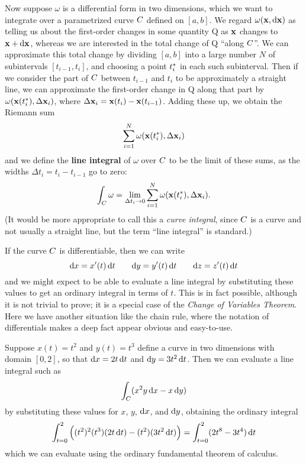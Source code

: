 \documentclass[12pt]{amsart}
\begin{document}
Now suppose $\omega$ is a differential form in two dimensions, which we want to integrate over a parametrized curve $C$ defined on $[a,b]$.
We regard $\omega(\mathbf{x},{\mathrm{d} \mathbf{x}})$ as telling us about the first-order changes in some quantity Q as $\mathbf{x}$ changes to $\mathbf{x}+{\mathrm{d} \mathbf{x}}$, whereas we are interested in the total change of Q ``along $C$''.
We can approximate this total change by dividing $[a,b]$ into a large number $N$ of subintervals $[t_{i-1},t_i]$, and choosing a point ${t}_{i}^*$ in each such subinterval.
Then if we consider the part of $C$ between $t_{i-1}$ and $t_i$ to be approximately a straight line, we can approximate the first-order change in Q along that part by $\omega(\mathbf{x}({t}_{i}^*),\Delta \mathbf{x}_i)$, where $\Delta\mathbf{x}_i = \mathbf{x}(t_i)-\mathbf{x}(t_{i-1})$.
Adding these up, we obtain the Riemann sum
\[ \sum_{i=1}^N \omega(\mathbf{x}({t}_{i}^*),\Delta \mathbf{x}_i) \]
and we define the \textbf{line integral} of $\omega$ over $C$ to be the limit of these sums, as the widths $\Delta t_i = t_i - t_{i-1}$ go to zero:
\begin{equation}
  \int_{C} \omega = \lim_{\Delta t_i \to 0} \sum_{i=1}^N \omega(\mathbf{x}({t}_{i}^*),\Delta \mathbf{x}_i).\label{eq:line-integral}
\end{equation}
(It would be more appropriate to call this a \textit{curve integral}, since $C$ is a curve and not usually a straight line, but the term ``line integral'' is standard.)

If the curve $C$ is differentiable, then we can write
\[{\mathrm{d} x} = x'(t)\,{\mathrm{d} t} \qquad {\ensuremath{\mathrm{d} y}} = y'(t) \,{\mathrm{d} t} \qquad {\ensuremath{\mathrm{d} z}} = z'(t)\,{\mathrm{d} t} \]
and we might expect to be able to evaluate a line integral by substituting these values to get an ordinary integral in terms of $t$.
This is in fact possible, although it is not trivial to prove; it is a special case of the \emph{Change of Variables Theorem}.
Here we have another situation like the chain rule, where the notation of differentials makes a deep fact appear obvious and easy-to-use.

\begin{eg}
  Suppose $x(t) = t^2$ and $y(t) = t^3$ define a curve in two dimensions with domain $[0,2]$, so that ${\mathrm{d} x} = 2t\,{\mathrm{d} t}$ and ${\mathrm{d} y} = 3t^2\,{\mathrm{d} t}$.
  Then we can evaluate a line integral such as
  \[ \int_{C} (x^2 y \,{\mathrm{d} x} - x \,{\mathrm{d} y}) \]
  by substituting these values for $x$, $y$, ${\mathrm{d} x}$, and ${\mathrm{d} y}$, obtaining the ordinary integral
  \[ \int_{t=0}^2 \Big( (t^2)^2(t^3)(2t\,{\mathrm{d} t}) - (t^2)(3t^2\,{\mathrm{d} t})\Big)
  = \int_{t=0}^2 (2t^8 - 3t^4)\,{\mathrm{d} t}\]
  which we can evaluate using the ordinary fundamental theorem of calculus.
\end{eg}
\end{document}
